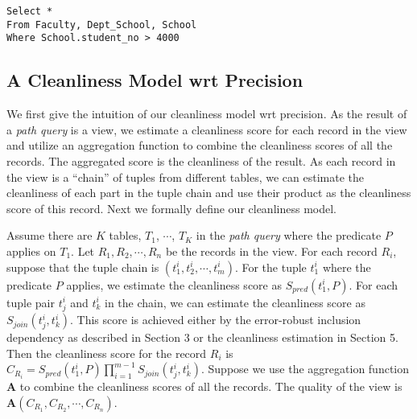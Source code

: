 \lstset{language=SQL}
\begin{lstlisting}
Select *
From Faculty, Dept_School, School
Where School.student_no > 4000
\end{lstlisting}

\subsection{A Cleanliness Model wrt Precision}\label{subsec:model:precision}

We first give the intuition of our cleanliness model wrt precision. As the
result of a \emph{path query} is a view, we estimate a cleanliness score for
each record in the view and utilize an aggregation function to combine the
cleanliness scores of all the records. The aggregated score is the cleanliness
of the result. As each record in the view is a ``chain'' of tuples from
different tables, we can estimate the cleanliness of each part in the tuple
chain and use their product as the cleanliness score of this record. Next we
formally define our cleanliness model.

Assume there are $K$ tables, $T_1$, $\cdots$, $T_K$ in the \emph{path query}
where the predicate $P$ applies on $T_1$. Let $R_1, R_2, \cdots, R_n$ be the
records in the view. For each record $R_i$, suppose that the tuple chain is
$(t^i_1, t^i_2, \cdots, t^i_m)$. For the tuple $t^i_1$ where the predicate $P$
applies, we estimate the cleanliness score as $S_{pred}(t^i_1, P)$. For each
tuple pair $t^i_j$ and $t^i_k$ in the chain, we can estimate the cleanliness
score as $S_{join}(t^i_j,t^i_k)$. This score is achieved either by the
error-robust inclusion dependency as described in Section 3 or the cleanliness
estimation in Section 5. Then the cleanliness score for the record $R_i$ is
$C_{R_i}=S_{pred}(t^i_1,P)\prod_{i=1}^{m-1}S_{join}(t^i_j,t^i_k)$. Suppose we
use the aggregation function $\mathbf{A}$ to combine the cleanliness scores of
all the records. The quality of the view is $\mathbf{A}(C_{R_1}, C_{R_2},
\cdots, C_{R_n})$.

\fi

